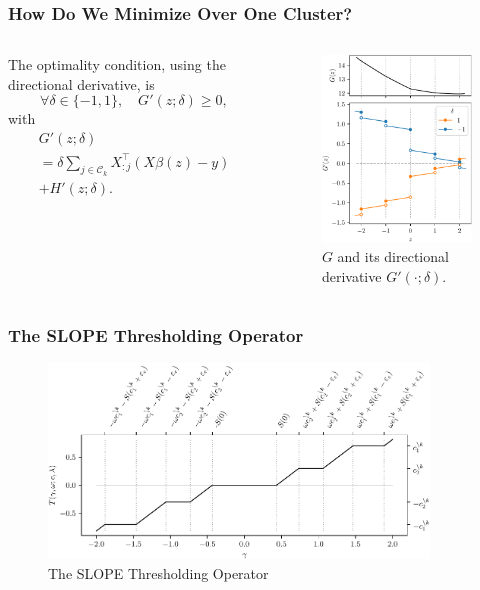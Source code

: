 \documentclass[10pt,aspectratio=169]{beamer}
\begin{document}
\begin{frame}
  \frametitle{How Do We Minimize Over One Cluster?}

  \begin{columns}
    \begin{column}{0.35\textwidth}
      The optimality condition, using the directional derivative, is
      \[
        \forall \delta \in \{-1, 1\}, \quad G'(z; \delta) \geq 0,
      \]
      with
      \[
        \begin{multlined}
          G'(z; \delta)  \\= \delta \sum_{j \in \mathcal{C}_k} X_{:j}^\top(X\beta(z) - y) \\
          + H'(z; \delta).
        \end{multlined}
      \]
    \end{column}
    \begin{column}{0.55\textwidth}
      \begin{figure}
        \centering
        \includegraphics[width=5.3cm]{figures/directional-derivative.pdf}
        \caption{%
          \(G\) and its directional derivative \(G'( \cdot ; \delta)\).
        }
      \end{figure}
    \end{column}
  \end{columns}
\end{frame}

\begin{frame}
  \frametitle{The SLOPE Thresholding Operator}

  \begin{figure}[htpb]
    \centering
    \includegraphics[width=0.9\textwidth]{figures/slope-thresholding.pdf}
    \caption{%
      The SLOPE Thresholding Operator
    }
  \end{figure}
\end{frame}
\end{document}
